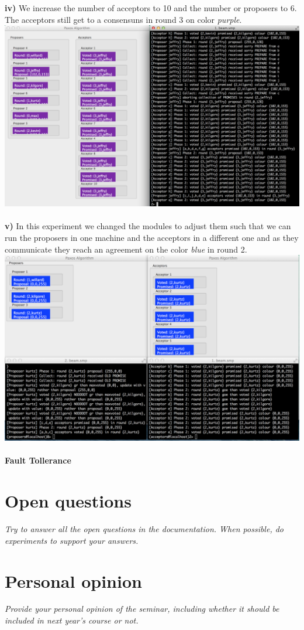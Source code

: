 \documentclass[a4paper, 11pt]{article}
\begin{document}
\textbf{iv)} We increase the number of acceptors to 10 and the number or proposers to 6. The acceptors still get to a consensuns in round 3 on color \textit{purple}.\\
\includegraphics[scale=0.35]{images/exp8.png} \\\\

\textbf{v)} In this experiment we changed the modules to adjust them such that we can run the proposers in one machine and the acceptors in a different one and as they communicate they reach an agreement on the color \textit{blue} in round 2.\\
\includegraphics[scale=0.35]{images/exp9.png} \\\\

\textbf{Fault Tollerance}



\section{Open questions}

\textit{Try to answer all the open questions in the documentation. When possible, do experiments to support your answers.}

\section{Personal opinion}

\textit{Provide your personal opinion of the seminar, including whether it should be included in next year's course or not.}
\end{document}
